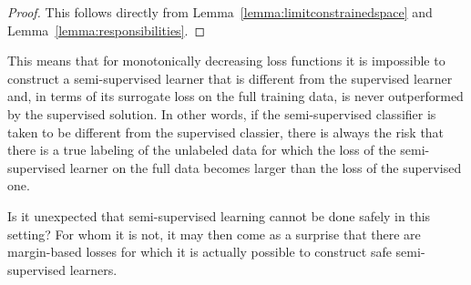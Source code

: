 \documentclass[twoside]{memoir}\usepackage[]{graphicx}\usepackage{xcolor}
\begin{document}
\begin{proof}
This follows directly from Lemma~\ref{lemma:limitconstrainedspace} and Lemma~\ref{lemma:responsibilities}.
\end{proof}

This means that for monotonically decreasing loss functions it is impossible to construct a semi-supervised learner that is different from the supervised learner and, in terms of its surrogate loss on the full training data, is never outperformed by the supervised solution.  In other words, if the semi-supervised classifier is taken to be different from the supervised classier, there is always the risk that there is a true labeling of the unlabeled data for which the loss of the semi-supervised learner on the full data becomes larger than the loss of the supervised one.

Is it unexpected that semi-supervised learning cannot be done safely in this setting?  For whom it is not, it may then come as a surprise that there are margin-based losses for which it is actually possible to construct safe semi-supervised learners.

%
%
%
%
\end{document}
